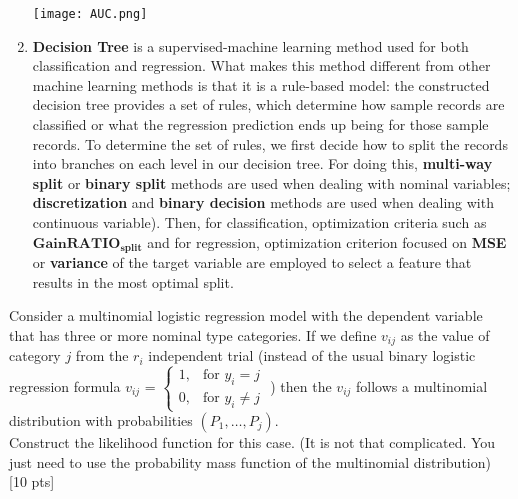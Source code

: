 \documentclass{homework}
\begin{document}
\begin{enumerate}
        \begin{center}
        \texttt{[image: AUC.png]}
        \end{center}
        
        \item \textbf{Decision Tree} is a supervised-machine learning method used for both classification and regression. What makes this method different from other machine learning methods is that it is a rule-based model: the constructed decision tree provides a set of rules, which determine how sample records are classified or what the regression prediction ends up being for those sample records. To determine the set of rules, we first decide how to split the records into branches on each level in our decision tree. For doing this, \textbf{multi-way split} or \textbf{binary split} methods are used when dealing with nominal variables; \textbf{discretization} and \textbf{binary decision} methods are used when dealing with continuous variable). Then, for classification, optimization criteria such as $\mathbf{GainRATIO_{split}}$ and for regression, optimization criterion focused on \textbf{MSE} or \textbf{variance} of the target variable are employed to select a feature that results in the most optimal split. 
        
        
        
        
        
    \end{enumerate}
    \vspace{3mm}
    
    \exercise*
	Consider a multinomial logistic regression model with the dependent variable that has three or more nominal type categories. If we define $v_{ij}$ as the value of category $j$ from the $r_i$ independent trial 
	\Big(instead of the usual binary logistic regression formula  
	$v_{ij}$ =
	$\begin{cases}
    1, & \text{for } y_{i}=j\\
    0, & \text{for } y_{i} \neq j
    \end{cases}$
	\Big) then the $v_{ij}$  follows a multinomial distribution with probabilities $(P_1,…,P_j)$.\\
	Construct the likelihood function for this case. (It is not that complicated. You just need to use the probability mass function of the multinomial distribution)  [10 pts]
	
\end{document}
